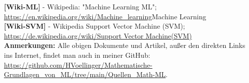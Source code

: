 \documentclass[12pt]{article}
\begin{document}
%
\textbf{[Wiki-ML]} - Wikipedia: "Machine Learning ML"; \url{https://en.wikipedia.org/wiki/Machine_learning}{Machine Learning}\\[0.2cm] 
%
\textbf{[Wiki-SVM]} - Wikipedia Support Vector Machine (SVM); \url{https://de.wikipedia.org/wiki/Support Vector Machine(SVM)} \\[0.2cm] 
%
\textbf{Anmerkungen:} Alle obigen Dokumente und Artikel, außer den direkten Links ins Internet, findet man auch in meiner GitHub: \url{https://github.com/HVoellinger/Mathematische-Grundlagen_von_ML/tree/main/Quellen_Math-ML}.\\[0.2cm]  
%
%
%

{\color{blue}{\printindex}}
\end{document}

